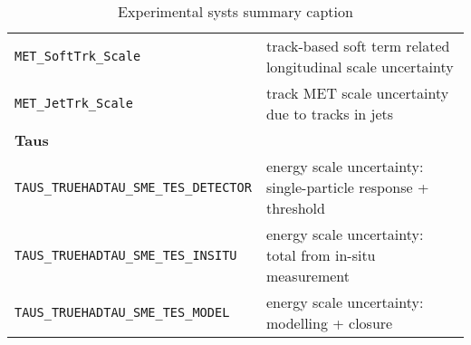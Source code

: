 \begin{table}
{\begin{tabular}{ll}
      \texttt{MET\_SoftTrk\_Scale} & track-based soft term related longitudinal scale uncertainty \\%
      \texttt{MET\_JetTrk\_Scale} & track MET scale uncertainty due to tracks in jets \\%
      {\bfseries Taus}&\\
      \texttt{TAUS\_TRUEHADTAU\_SME\_TES\_DETECTOR} & energy scale uncertainty: single-particle response + threshold \\%
      \texttt{TAUS\_TRUEHADTAU\_SME\_TES\_INSITU} & energy scale uncertainty: total from in-situ measurement \\%
      \texttt{TAUS\_TRUEHADTAU\_SME\_TES\_MODEL} & energy scale uncertainty: modelling + closure \\%
      \bottomrule
    \end{tabular}
  }
  \caption{Experimental systs summary caption}
  \label{tab:expSyst}
\end{table}